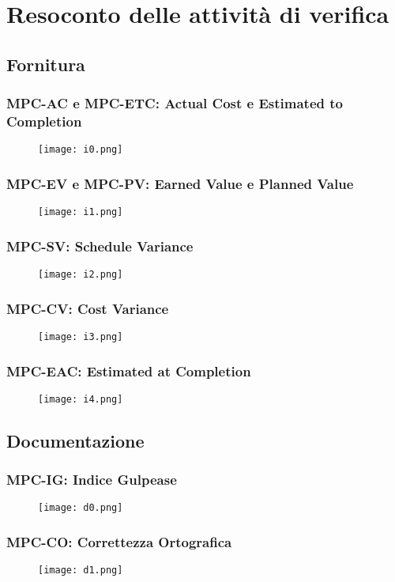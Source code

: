\section{Resoconto delle attività di verifica}

\subsection{Fornitura}

\subsubsection{MPC-AC e MPC-ETC: Actual Cost e Estimated to Completion}
\begin{figure}[h] \texttt{[image: i0.png]} \end{figure}

\subsubsection{MPC-EV e MPC-PV: Earned Value e Planned Value}
\begin{figure}[h] \texttt{[image: i1.png]} \end{figure}

\subsubsection{MPC-SV: Schedule Variance}
\begin{figure}[h] \texttt{[image: i2.png]} \end{figure}

\subsubsection{MPC-CV: Cost Variance}
\begin{figure}[h] \texttt{[image: i3.png]} \end{figure}

\subsubsection{MPC-EAC: Estimated at Completion}
\begin{figure}[h] \texttt{[image: i4.png]} \end{figure}

\subsection{Documentazione}

\subsubsection{MPC-IG: Indice Gulpease}
\begin{figure}[h] \texttt{[image: d0.png]} \end{figure}

\subsubsection{MPC-CO: Correttezza Ortografica}
\begin{figure}[h] \texttt{[image: d1.png]} \end{figure}

